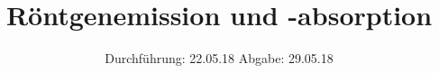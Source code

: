 

\subject{V602}
\title{Röntgenemission und -absorption}
\date{
  Durchführung: 22.05.18
  \hspace{3em}
  Abgabe: 29.05.18
}



\maketitle
\thispagestyle{empty}
\tableofcontents
\newpage








\newpage
\printbibliography


